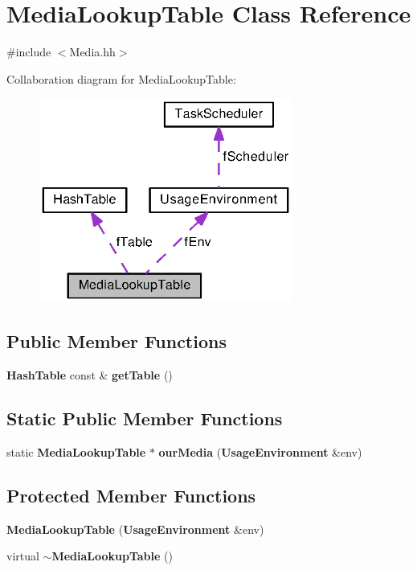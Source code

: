 \section{Media\+Lookup\+Table Class Reference}
\label{classMediaLookupTable}


{\ttfamily \#include $<$Media.\+hh$>$}



Collaboration diagram for Media\+Lookup\+Table\+:
\nopagebreak
\begin{figure}[H]
\begin{center}
\leavevmode
\includegraphics[width=237pt]{classMediaLookupTable__coll__graph}
\end{center}
\end{figure}
\subsection*{Public Member Functions}
\begin{DoxyCompactItemize}
\item 
{\bf Hash\+Table} const \& {\bf get\+Table} ()
\end{DoxyCompactItemize}
\subsection*{Static Public Member Functions}
\begin{DoxyCompactItemize}
\item 
static {\bf Media\+Lookup\+Table} $\ast$ {\bf our\+Media} ({\bf Usage\+Environment} \&env)
\end{DoxyCompactItemize}
\subsection*{Protected Member Functions}
\begin{DoxyCompactItemize}
\item 
{\bf Media\+Lookup\+Table} ({\bf Usage\+Environment} \&env)
\item 
virtual {\bf $\sim$\+Media\+Lookup\+Table} ()
\end{DoxyCompactItemize}
